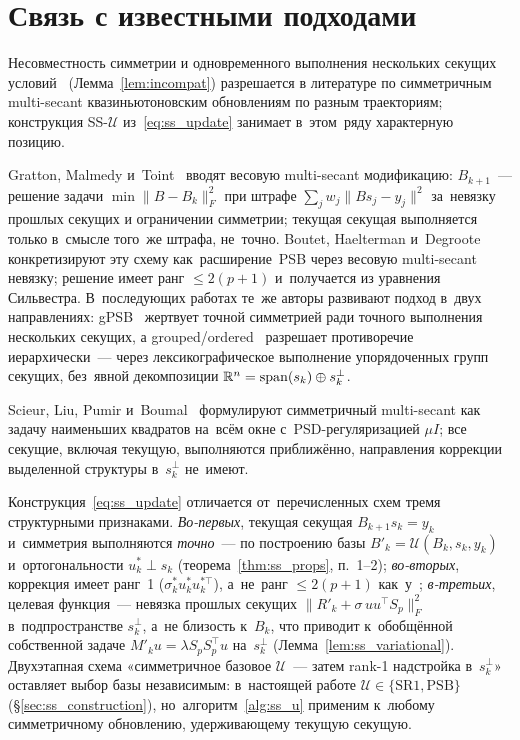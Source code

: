 \section{Связь с известными подходами}\label{sec:ss_related}

Несовместность симметрии и одновременного выполнения нескольких
секущих условий~\cite{schnabel1983} (Лемма~\ref{lem:incompat})
разрешается в литературе по симметричным multi-secant
квазиньютоновским обновлениям по разным траекториям; конструкция
SS-$\mathcal{U}$ из~\eqref{eq:ss_update} занимает в~этом~ряду
характерную позицию.

Gratton, Malmedy и~Toint~\cite{gratton2015} вводят весовую multi-secant
модификацию: $B_{k+1}$~--- решение задачи $\min \|B-B_k\|_F^2$ при
штрафе $\sum_{j} w_j\|B s_j - y_j\|^2$ за~невязку прошлых секущих и
ограничении симметрии; текущая секущая выполняется только в~смысле
того~же штрафа, не~точно. Boutet, Haelterman и~Degroote~\cite{boutet2020}
конкретизируют эту схему как~расширение~PSB через весовую multi-secant
невязку; решение имеет ранг $\le 2(p{+}1)$ и~получается из уравнения
Сильвестра. В~последующих работах те~же авторы развивают подход в~двух
направлениях: gPSB~\cite{boutet2021} жертвует точной симметрией ради
точного выполнения нескольких секущих, а grouped/ordered~\cite{boutet2022}
разрешает противоречие иерархически~--- через лексикографическое
выполнение упорядоченных групп секущих, без~явной декомпозиции
$\mathbb{R}^n = \operatorname{span}(s_k)\oplus s_k^\perp$.

Scieur, Liu, Pumir и~Boumal~\cite{scieur2021} формулируют симметричный
multi-secant как задачу наименьших квадратов на~всём окне с~PSD-регуляризацией
$\mu I$; все секущие, включая текущую, выполняются приближённо, направления
коррекции выделенной структуры в~$s_k^\perp$ не~имеют.

Конструкция~\eqref{eq:ss_update} отличается от~перечисленных схем тремя
структурными признаками. \emph{Во-первых}, текущая секущая
$B_{k+1}s_k = y_k$ и~симметрия выполняются \emph{точно}~--- по
построению базы $B'_k = \mathcal{U}(B_k,s_k,y_k)$ и~ортогональности
$u_k^*\perp s_k$ (теорема~\ref{thm:ss_props}, п.~1--2);
\emph{во-вторых}, коррекция имеет ранг~1 ($\sigma_k^* u_k^* u_k^{*\top}$),
а~не~ранг $\le 2(p{+}1)$ как~у~\cite{gratton2015,boutet2020};
\emph{в-третьих}, целевая функция~--- невязка прошлых секущих
$\|R'_k + \sigma\, u u^\top S_p\|_F^2$ в~подпространстве $s_k^\perp$,
а~не близость к~$B_k$, что приводит к~обобщённой собственной задаче
$M'_k u = \lambda S_p S_p^\top u$ на~$s_k^\perp$
(Лемма~\ref{lem:ss_variational}). Двухэтапная схема «симметричное базовое
$\mathcal{U}$~--- затем rank-1 надстройка в~$s_k^\perp$» оставляет выбор
базы независимым: в~настоящей работе $\mathcal{U}\in\{\mathrm{SR1},\mathrm{PSB}\}$
(\S\ref{sec:ss_construction}), но~алгоритм~\ref{alg:ss_u} применим к~любому
симметричному обновлению, удерживающему текущую секущую.


